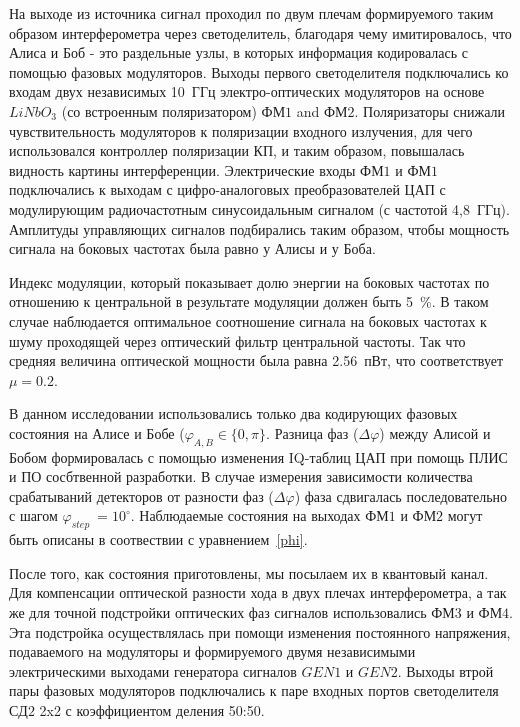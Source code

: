 На выходе из источника сигнал проходил по двум плечам формируемого таким образом интерферометра через светоделитель, благодаря чему имитировалось, что Алиса и Боб - это раздельные узлы, в которых информация кодировалась с помощью фазовых модуляторов. Выходы первого светоделителя подключались ко входам двух независимых 10~ГГц электро-оптических модуляторов на основе $LiNbO_3$ (со встроенным поляризатором) $ФМ1$ and $ФМ2$. Поляризаторы снижали чувствительность модуляторов к поляризации входного излучения, для чего использовался контроллер поляризации КП, и таким образом, повышалась видность картины интерференции. Электрические входы $ФМ1$ и $ФМ1$ подключались к выходам с цифро-аналоговых преобразователей ЦАП с модулирующим радиочастотным синусоидальным сигналом (с частотой 4,8~ГГц). Амплитуды управляющих сигналов подбирались таким образом, чтобы мощность сигнала на боковых частотах была равно у Алисы и у Боба. 


Индекс модуляции, который показывает долю энергии на боковых частотах по отношению к центральной в результате модуляции должен быть 5~\%. В таком случае наблюдается оптимальное соотношение сигнала на боковых частотах к шуму проходящей через оптический фильтр центральной частоты.  Так что средняя величина оптической мощности была равна 2.56~пВт, что соответствует $\mu=0.2$.  


В данном исследовании  использовались только два кодирующих фазовых состояния на Алисе и Бобе ($\varphi_{A,B}\in\{0,\pi\}$. Разница фаз ($\Delta\varphi$) между Алисой и Бобом формировалась с помощью изменения IQ-таблиц ЦАП при помощь ПЛИС и ПО сосбтвенной разработки. В случае измерения зависимости количества срабатываний детекторов от разности фаз ($\Delta\varphi$) фаза сдвигалась последовательно с шагом $\varphi_{step}\ = 10^{\circ}$. Наблюдаемые состояния на выходах $ФМ1$ и $ФМ2$ могут быть описаны в соотвествии с уравнением~\ref{phi}.

После того, как состояния приготовлены, мы посылаем их в квантовый канал. Для компенсации оптической разности хода в двух плечах интерферометра, а так же для точной подстройки оптических фаз сигналов использовались $ФМ3$ и $ФМ4$. Эта подстройка осуществлялась при помощи изменения постоянного напряжения, подаваемого на модуляторы и формируемого двумя независимыми электрическими выходами генератора сигналов $GEN1$ и $GEN2$. Выходы втрой пары фазовых модуляторов подключались к паре входных портов светоделителя $СД2$ 2x2 с коэффициентом деления 50:50.


